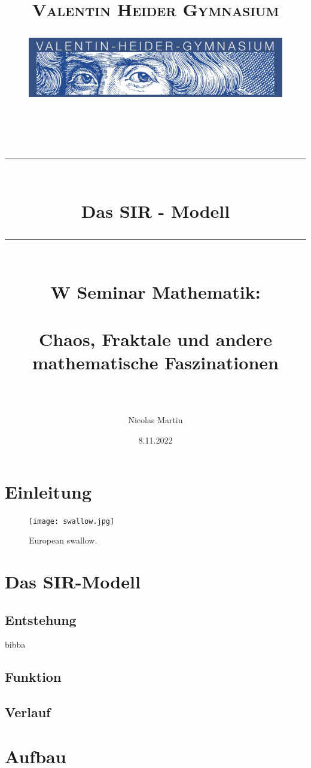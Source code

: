 \documentclass[12pt]{scrartcl} %
\title{	
	\normalfont\normalsize
	\vspace{200pt}
	\textsc{Valentin Heider Gymnasium}\\
	\begin{figure}[h] %
	\centering
	\includegraphics[width=0.5\columnwidth]{VHGLogo.jpg} 
	\end{figure}
	\vspace{25pt}\\
	
	\rule{\linewidth}{0.5pt}\\
	\vspace{20pt}
	{\huge Das SIR - Modell}\\
	\vspace{12pt}
	\rule{\linewidth}{2pt}\\
	\vspace{20pt}
	{\Large W Seminar Mathematik:}\\
	\vspace{12pt}\\
	{\Large Chaos, Fraktale und andere mathematische Faszinationen}\\
	\vspace{15pt}\\
}
\author{\LARGE Nicolas Martin} %
\date{\normalsize 8.11.2022} %
\begin{document}

\maketitle %
\newpage

\doublespacing
\tableofcontents
\onehalfspacing
\newpage


\section{Einleitung}

\begin{figure}[h] %
	\centering
	\texttt{[image: swallow.jpg]} %
	\caption{European swallow.}
\end{figure}


\section{Das SIR-Modell}

\subsection{Entstehung}

bibba \cite[spage 69]{1}


\subsection{Funktion}


\subsection{Verlauf}


\section{Aufbau}
\end{document}

